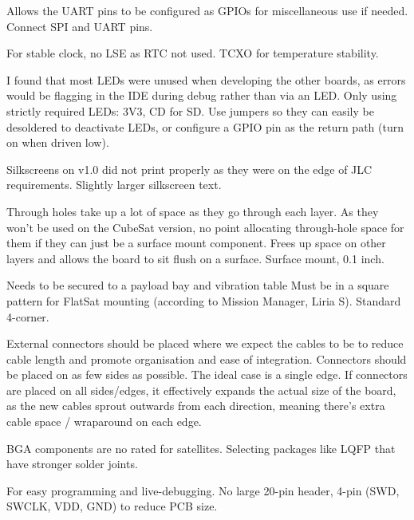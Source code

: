 {Allows the UART pins to be configured as GPIOs for miscellaneous use if needed.}
{Connect SPI and UART pins.}


{For stable clock, no LSE as RTC not used.}
{TCXO for temperature stability.}

{I found that most LEDs were unused when developing the other boards, as errors would be flagging in the IDE during debug rather than via an LED.}
{Only using strictly required LEDs: 3V3, CD for SD. Use jumpers so they can easily be desoldered to deactivate LEDs, or configure a GPIO pin as the return path (turn on when driven low).}


{Silkscreens on v1.0 did not print properly as they were on the edge of JLC requirements.}
{Slightly larger silkscreen text.}

{Through holes take up a lot of space as they go through each layer. As they won't be used on the CubeSat version, no point allocating through-hole space for them if they can just be a surface mount component. Frees up space on other layers and allows the board to sit flush on a surface.}
{Surface mount, 0.1 inch.}

{Needs to be secured to a payload bay and vibration table}
{Must be in a square pattern for FlatSat mounting (according to Mission Manager, Liria S). Standard 4-corner.}

{External connectors should be placed where we expect the cables to be to reduce cable length and promote organisation and ease of integration.}
{Connectors should be placed on as few sides as possible. The ideal case is a single edge. If connectors are placed on all sides/edges, it effectively expands the actual size of the board, as the new cables sprout outwards from each direction, meaning there's extra cable space / wraparound on each edge.}

{BGA components are no rated for satellites.}
{Selecting packages like LQFP that have stronger solder joints.}


{For easy programming and live-debugging.}
{No large 20-pin header, 4-pin (SWD, SWCLK, VDD, GND) to reduce PCB size.}

